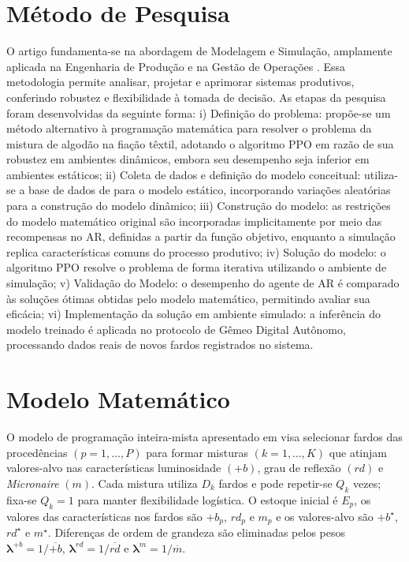 \documentclass[a4paper,12pt]{article}
\begin{document}
\section{Método de Pesquisa}

O artigo fundamenta-se na abordagem de Modelagem e Simulação, amplamente aplicada na Engenharia de Produção e na Gestão de Operações \cite{ganga_metodologia_2011}. Essa metodologia permite analisar, projetar e aprimorar sistemas produtivos, conferindo robustez e flexibilidade à tomada de decisão. As etapas da pesquisa foram desenvolvidas da seguinte forma: i) Definição do problema: propõe-se um método alternativo à programação matemática para resolver o problema da mistura de algodão na fiação têxtil, adotando o algoritmo PPO em razão de sua robustez em ambientes dinâmicos, embora seu desempenho seja inferior em ambientes estáticos; ii) Coleta de dados e definição do modelo conceitual: utiliza-se a base de dados de \cite{takahashi_2016} para o modelo estático, incorporando variações aleatórias para a construção do modelo dinâmico; iii) Construção do modelo: as restrições do modelo matemático original são incorporadas implicitamente por meio das recompensas no AR, definidas a partir da função objetivo, enquanto a simulação replica características comuns do processo produtivo; iv) Solução do modelo: o algoritmo PPO resolve o problema de forma iterativa utilizando o ambiente de simulação; v) Validação do Modelo: o desempenho do agente de AR é comparado às soluções ótimas obtidas pelo modelo matemático, permitindo avaliar sua eficácia; vi) Implementação da solução em ambiente simulado: a inferência do modelo treinado é aplicada no protocolo de Gêmeo Digital Autônomo, processando dados reais de novos fardos registrados no sistema.


\section{Modelo Matemático}

O modelo de programação inteira-mista apresentado em \cite{takahashi_2016} visa selecionar fardos das procedências $(p=1,\dots,P )$ para formar misturas $(k=1,\dots,K )$ que atinjam valores-alvo nas características luminosidade \((+b)\), grau de reflexão \((rd)\) e \emph{Micronaire} \((m)\).  Cada mistura utiliza \(D_k\) fardos e pode repetir-se \(Q_k\) vezes; fixa-se \(Q_k=1\) para manter flexibilidade logística.  O estoque inicial é \(E_p\), os valores das características nos fardos são \(+b_p\), \(rd_p\) e \(m_p\) e os valores-alvo são \(+b^{\!\star}\), \(rd^{\!\star}\) e \(m^{\!\star}\).  Diferenças de ordem de grandeza são eliminadas pelos pesos \(\boldsymbol{\lambda}^{+b}=1/\overline{+b}\), \(\boldsymbol{\lambda}^{rd}=1/\overline{rd}\) e \(\boldsymbol{\lambda}^{m}=1/\overline{m}\).  
\end{document}
